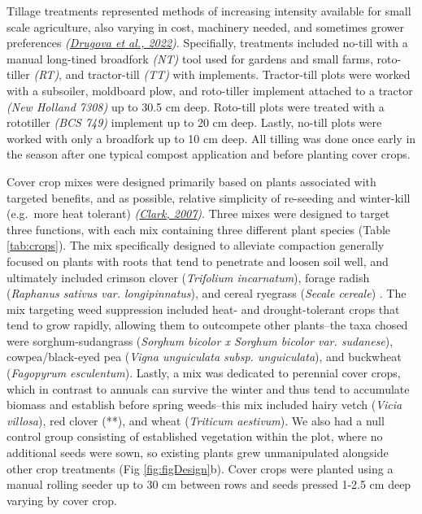 \documentclass[
  12pt,
]{article}
\begin{document}
Tillage treatments represented methods of increasing intensity available for small scale agriculture, also varying in cost, machinery needed, and sometimes grower preferences \emph{(\protect\hyperlink{ref-drugova22}{Drugova et al., 2022})}.
Specifially, treatments included no-till with a manual long-tined broadfork \emph{(NT)} tool used for gardens and small farms, roto-tiller \emph{(RT)}, and tractor-till \emph{(TT)} with implements.
Tractor-till plots were worked with a subsoiler, moldboard plow, and roto-tiller implement attached to a tractor \emph{(New Holland 7308)} up to 30.5 cm
deep.
Roto-till plots were treated with a rototiller \emph{(BCS 749)} implement up to 20 cm
deep.
Lastly, no-till plots were worked with only a broadfork up to 10 cm
deep.
All tilling was done once early in the season after one typical compost application and before planting cover crops.

Cover crop mixes were designed primarily based on plants associated with targeted benefits, and as possible, relative simplicity of re-seeding and winter-kill (e.g.~more heat tolerant) \emph{(\protect\hyperlink{ref-clark07}{Clark, 2007})}.
Three mixes were designed to target three functions, with each mix containing three different plant species (Table \ref{tab:crops}).
The mix specifically designed to alleviate compaction generally focused on plants with roots that tend to penetrate and loosen soil well, and ultimately included
crimson clover (\emph{Trifolium incarnatum}),
forage radish (\emph{Raphanus sativus var. longipinnatus}), and
cereal ryegrass (\emph{Secale cereale})
.
The mix targeting weed suppression included heat- and drought-tolerant crops that tend to grow rapidly, allowing them to outcompete other plants--the taxa chosed were
sorghum-sudangrass (\emph{Sorghum bicolor x Sorghum bicolor var. sudanese}),
cowpea/black-eyed pea (\emph{Vigna unguiculata subsp. unguiculata}), and
buckwheat (\emph{Fagopyrum esculentum}).
Lastly, a mix was dedicated to perennial cover crops, which in contrast to annuals can survive the winter and thus tend to accumulate biomass and establish before spring weeds--this mix included
hairy vetch (\emph{Vicia villosa}),
red clover (**), and
wheat (\emph{Triticum aestivum}).
We also had a null control group consisting of established vegetation within the plot, where no additional seeds were sown, so existing plants grew unmanipulated alongside other crop treatments (Fig \ref{fig:figDesign}b).
Cover crops were planted using a manual rolling seeder up to 30 cm between rows and seeds pressed 1-2.5 cm deep varying by cover crop.
\end{document}
